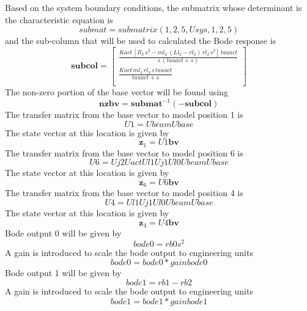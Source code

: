 \documentclass[12pt]{article}
\newcommand{\M}[1]{\mathbf{#1}}
\begin{document}
Based on the system boundary conditions, the submatrix whose determinant is the characteristic equation is
\begin{equation}
	submat=submatrix(1,2,5,Usys,1,2,5)
\end{equation}
and the sub-column that will be used to calculated the Bode response is
\begin{equation}
\M{subcol}= \left[ \begin{array}{c} \displaystyle \frac{Kact\,\left[Il_2\,s^2-ml_2\,\left(Ll_2-rl_2\right)\,rl_2 \,s^2\right]\,tauact}{s\,\left(tauact+s\right)}\\  \displaystyle \frac{Kact\, ml_2\,rl_2\,s\,tauact}{tauact+s}\\ \end{array} \right] 
\end{equation}
The non-zero portion of the base vector will be found using
\begin{equation}
\M{nzbv}=\M{submat}^{-1}\left(-\M{subcol}\right)
\end{equation}
The transfer matrix from the base vector to model position 1 is
\begin{equation}
	U1=Ubeam Ubase
\end{equation}
The state vector at this location is given by
\begin{equation}
	\M{z}_{1}=U1 \M{bv}
\end{equation}
The transfer matrix from the base vector to model position 6 is
\begin{equation}
	U6=Uj2 Uact Ul1 Uj1 Ul0 Ubeam Ubase
\end{equation}
The state vector at this location is given by
\begin{equation}
	\M{z}_{6}=U6 \M{bv}
\end{equation}
The transfer matrix from the base vector to model position 4 is
\begin{equation}
	U4=Ul1 Uj1 Ul0 Ubeam Ubase
\end{equation}
The state vector at this location is given by
\begin{equation}
	\M{z}_{4}=U4 \M{bv}
\end{equation}
Bode output 0 will be given by
\begin{equation}
	bode0=rb0 s^2
\end{equation}
A gain is introduced to scale the bode output to engineering units
\begin{equation}
	bode0=bode0*gainbode0
\end{equation}
Bode output 1 will be given by
\begin{equation}
	bode1=rb1-rb2
\end{equation}
A gain is introduced to scale the bode output to engineering units
\begin{equation}
	bode1=bode1*gainbode1
\end{equation}
\end{document}
